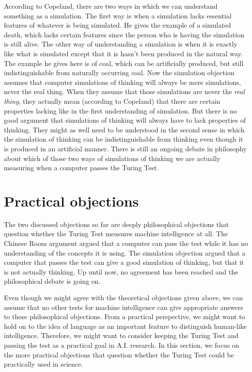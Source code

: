 According to Copeland, there are two ways in which we can understand something as a simulation. The first way is when a simulation lacks essential features of whatever is being simulated. He gives the example of a simulated death, which lacks certain features since the person who is having the simulation is still alive. The other way of understanding a simulation is when it is exactly like what is simulated except that it is hasn't been produced in the natural way. The example he gives here is of coal, which can be artificially produced, but still indistinguishable from naturally occurring coal.
Now the simulation objection assumes that computer simulations of thinking will always be mere simulations, never the real thing. When they assume that those simulations are never the \textit{real thing}, they actually mean (according to Copeland) that there are certain properties lacking like in the first understanding of simulation. But there is no good argument that simulations of thinking will always have to lack properties of thinking. They might as well need to be understood in the second sense in which the simulation of thinking can be indistinguishable from thinking even though it is produced in an artificial manner. There is still an ongoing debate in philosophy about which of those two ways of simulations of thinking we are actually measuring when a computer passes the Turing Test.


\section{Practical objections}
The two discussed objections so far are deeply philosophical objections that question whether the Turing Test measures machine intelligence at all. The Chinese Room argument argued that a computer can pass the test while it has no understanding of the concepts it is using. The simulation objection argued that a computer that passes the test can give a good simulation of thinking, but that it is not actually thinking. Up until now, no agreement has been reached and the philosophical debate is going on.

Even though we might agree with the theoretical objections given above, we can assume that no other tests for machine intelligence can give appropriate answers to these philosophical objections. From a practical perspective, we might want to hold on to the idea of language as an important feature to distinguish human-like intelligence. Therefore, we might want to consider keeping the Turing Test and passing the test as a practical goal in A.I. research. In this section, we focus on the more practical objections that question whether the Turing Test could be practically used in science.

